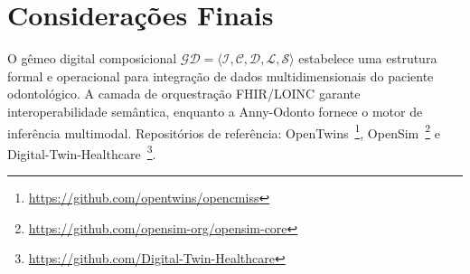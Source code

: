 \section{Considerações Finais}
\label{sec:gd-consideracoes}

O gêmeo digital composicional $\mathcal{GD} = \langle \mathcal{I}, \mathcal{C}, \mathcal{D}, \mathcal{L}, \mathcal{S} \rangle$ estabelece uma estrutura formal e operacional para integração de dados multidimensionais do paciente odontológico. A camada de orquestração FHIR/LOINC garante interoperabilidade semântica, enquanto a Anny-Odonto fornece o motor de inferência multimodal. Repositórios de referência: OpenTwins~\footnote{\url{https://github.com/opentwins/opencmiss}}, OpenSim~\footnote{\url{https://github.com/opensim-org/opensim-core}} e Digital-Twin-Healthcare~\footnote{\url{https://github.com/Digital-Twin-Healthcare}}.
\endinput
